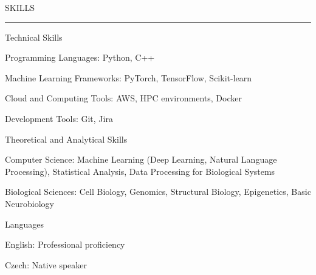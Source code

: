 \documentclass{resume} %
\renewenvironment{rSection}[1]{
\sectionskip
\textcolor{CarnegieMellonRed}{\MakeUppercase{#1}}
\sectionlineskip
\hrule
\begin{list}{}{
\setlength{\leftmargin}{1.5em}
}
\item[]
}{
\end{list}
}
\begin{document}
\begin{rSection}{Skills} \itemsep -2pt

\begin{rProject}{Technical Skills}{}{}{}
    \item Programming Languages: Python, C++
    \item Machine Learning Frameworks: PyTorch, TensorFlow, Scikit-learn
    \item Cloud and Computing Tools: AWS, HPC environments, Docker
    \item Development Tools: Git, Jira
\end{rProject}

\begin{rProject}{Theoretical and Analytical Skills}{}{}{}
    \item Computer Science: Machine Learning (Deep Learning, Natural Language Processing), Statistical Analysis, Data Processing for Biological Systems
    \item Biological Sciences: Cell Biology, Genomics, Structural Biology, Epigenetics, Basic Neurobiology
\end{rProject}

\begin{rProject}{Languages}{}{}{}
    \item English: Professional proficiency
    \item Czech: Native speaker
\end{rProject}

\end{rSection}
\end{document}
